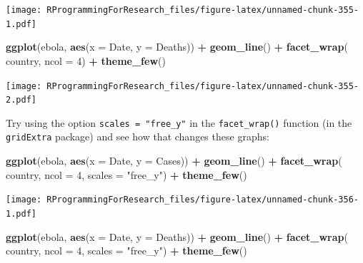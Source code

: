 \documentclass[]{book}
\makeatletter
\newenvironment{Shaded}{\begin{snugshade}}{\end{snugshade}}
\newcommand{\KeywordTok}[1]{\textcolor[rgb]{0.13,0.29,0.53}{\textbf{#1}}}
\newcommand{\DataTypeTok}[1]{\textcolor[rgb]{0.13,0.29,0.53}{#1}}
\newcommand{\DecValTok}[1]{\textcolor[rgb]{0.00,0.00,0.81}{#1}}
\newcommand{\StringTok}[1]{\textcolor[rgb]{0.31,0.60,0.02}{#1}}
\newcommand{\OperatorTok}[1]{\textcolor[rgb]{0.81,0.36,0.00}{\textbf{#1}}}
\newcommand{\NormalTok}[1]{#1}
\newenvironment{kframe}{%
\medskip{}
\setlength{\fboxsep}{.8em}
 \def\at@end@of@kframe{}%
 \ifinner\ifhmode%
  \def\at@end@of@kframe{\end{minipage}}%
  \begin{minipage}{\columnwidth}%
 \fi\fi%
 \def\FrameCommand##1{\hskip\@totalleftmargin \hskip-\fboxsep
 \colorbox{shadecolor}{##1}\hskip-\fboxsep
     \hskip-\linewidth \hskip-\@totalleftmargin \hskip\columnwidth}%
 \MakeFramed {\advance\hsize-\width
   \@totalleftmargin\z@ \linewidth\hsize
   \@setminipage}}%
 {\par\unskip\endMakeFramed%
 \at@end@of@kframe}
\renewenvironment{Shaded}{\begin{kframe}}{\end{kframe}}
\theoremstyle{definition}
\theoremstyle{definition}
\theoremstyle{definition}
\theoremstyle{remark}
\makeatother
\begin{document}
\texttt{[image: RProgrammingForResearch\_files/figure-latex/unnamed-chunk-355-1.pdf]}

\begin{Shaded}
\begin{Highlighting}[]
\KeywordTok{ggplot}\NormalTok{(ebola, }\KeywordTok{aes}\NormalTok{(}\DataTypeTok{x =}\NormalTok{ Date, }\DataTypeTok{y =}\NormalTok{ Deaths)) }\OperatorTok{+}\StringTok{ }
\StringTok{        }\KeywordTok{geom_line}\NormalTok{() }\OperatorTok{+}\StringTok{ }
\StringTok{        }\KeywordTok{facet_wrap}\NormalTok{(}\OperatorTok{~}\StringTok{ }\NormalTok{country, }\DataTypeTok{ncol =} \DecValTok{4}\NormalTok{) }\OperatorTok{+}\StringTok{ }
\StringTok{        }\KeywordTok{theme_few}\NormalTok{()}
\end{Highlighting}
\end{Shaded}

\texttt{[image: RProgrammingForResearch\_files/figure-latex/unnamed-chunk-355-2.pdf]}

Try using the option \texttt{scales\ =\ "free\_y"} in the
\texttt{facet\_wrap()} function (in the \texttt{gridExtra} package) and
see how that changes these graphs:

\begin{Shaded}
\begin{Highlighting}[]
\KeywordTok{ggplot}\NormalTok{(ebola, }\KeywordTok{aes}\NormalTok{(}\DataTypeTok{x =}\NormalTok{ Date, }\DataTypeTok{y =}\NormalTok{ Cases)) }\OperatorTok{+}\StringTok{ }
\StringTok{        }\KeywordTok{geom_line}\NormalTok{() }\OperatorTok{+}\StringTok{ }
\StringTok{        }\KeywordTok{facet_wrap}\NormalTok{(}\OperatorTok{~}\StringTok{ }\NormalTok{country, }\DataTypeTok{ncol =} \DecValTok{4}\NormalTok{, }\DataTypeTok{scales =} \StringTok{"free_y"}\NormalTok{) }\OperatorTok{+}\StringTok{ }
\StringTok{        }\KeywordTok{theme_few}\NormalTok{()}
\end{Highlighting}
\end{Shaded}

\texttt{[image: RProgrammingForResearch\_files/figure-latex/unnamed-chunk-356-1.pdf]}

\begin{Shaded}
\begin{Highlighting}[]
\KeywordTok{ggplot}\NormalTok{(ebola, }\KeywordTok{aes}\NormalTok{(}\DataTypeTok{x =}\NormalTok{ Date, }\DataTypeTok{y =}\NormalTok{ Deaths)) }\OperatorTok{+}\StringTok{ }
\StringTok{        }\KeywordTok{geom_line}\NormalTok{() }\OperatorTok{+}\StringTok{ }
\StringTok{        }\KeywordTok{facet_wrap}\NormalTok{(}\OperatorTok{~}\StringTok{ }\NormalTok{country, }\DataTypeTok{ncol =} \DecValTok{4}\NormalTok{, }\DataTypeTok{scales =} \StringTok{"free_y"}\NormalTok{) }\OperatorTok{+}\StringTok{ }
\StringTok{        }\KeywordTok{theme_few}\NormalTok{()}
\end{Highlighting}
\end{Shaded}
\end{document}
